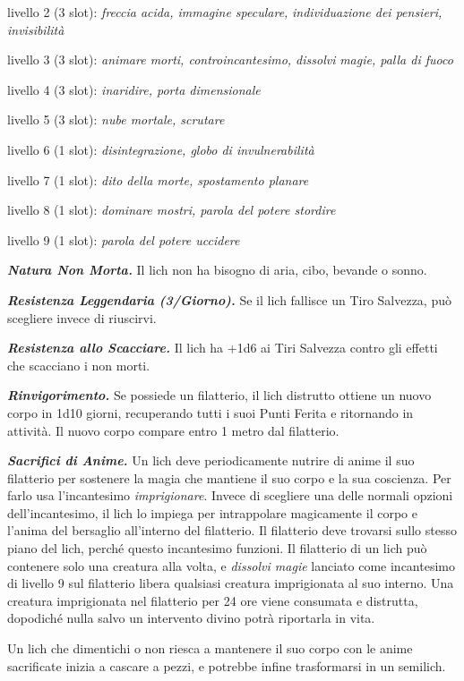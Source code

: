 \begin{multicols}{2}
	livello 2 (3 slot): \textit{freccia acida, immagine speculare,} \textit{individuazione dei pensieri, invisibilità}

	livello 3 (3 slot): \textit{animare morti, controincantesimo, dissolvi} \textit{magie, palla di fuoco}

	livello 4 (3 slot): \textit{inaridire, porta dimensionale}

	livello 5 (3 slot): \textit{nube mortale, scrutare}

	livello 6 (1 slot): \textit{disintegrazione, globo di invulnerabilità}

	livello 7 (1 slot): \textit{dito della morte, spostamento planare}

	livello 8 (1 slot): \textit{dominare mostri, parola del potere stordire}

	livello 9 (1 slot): \textit{parola del potere uccidere}

	\textit{\textbf{Natura Non Morta.}} Il lich non ha bisogno di aria, cibo, bevande o sonno.

	\textit{\textbf{Resistenza Leggendaria (3/Giorno).}} Se il lich fallisce un Tiro Salvezza, può scegliere invece di riuscirvi.

	\textit{\textbf{Resistenza allo Scacciare.}} Il lich ha +1d6 ai Tiri Salvezza contro gli effetti che scacciano i non morti.

	\textit{\textbf{Rinvigorimento.}} Se possiede un filatterio, il lich distrutto ottiene un nuovo corpo in 1d10 giorni, recuperando tutti i suoi Punti Ferita e ritornando in attività. Il nuovo corpo compare entro 1 metro dal filatterio.

	\textit{\textbf{Sacrifici di Anime.}} Un lich deve periodicamente nutrire di anime il suo filatterio per sostenere la magia che mantiene il suo corpo e la sua coscienza. Per farlo usa l'incantesimo \textit{imprigionare}. Invece di scegliere una delle normali opzioni dell'incantesimo, il lich lo impiega per intrappolare magicamente il corpo e l'anima del bersaglio all'interno del filatterio. Il filatterio deve trovarsi sullo stesso piano del lich, perché questo incantesimo funzioni. Il filatterio di un lich può contenere solo una creatura alla volta, e \textit{dissolvi magie} lanciato come incantesimo di livello 9 sul filatterio libera qualsiasi creatura imprigionata al suo interno. Una creatura imprigionata nel filatterio per 24 ore viene consumata e distrutta, dopodiché nulla salvo un intervento divino potrà riportarla in vita.

	Un lich che dimentichi o non riesca a mantenere il suo corpo con le anime sacrificate inizia a cascare a pezzi, e potrebbe infine trasformarsi in un semilich.


\end{multicols}

